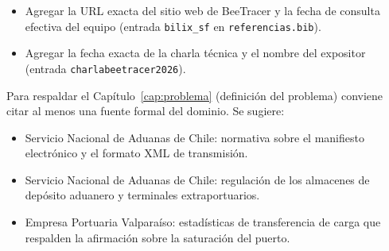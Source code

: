 
\begin{pendiente}
\begin{itemize}
    \item Agregar la URL exacta del sitio web de BeeTracer y la fecha de consulta efectiva del
          equipo (entrada \texttt{bilix\_sf} en \texttt{referencias.bib}).
    \item Agregar la fecha exacta de la charla técnica y el nombre del expositor (entrada
          \texttt{charlabeetracer2026}).
\end{itemize}
\end{pendiente}

\begin{pendiente}
Para respaldar el Capítulo~\ref{cap:problema} (definición del problema) conviene citar al menos una
fuente formal del dominio. Se sugiere:

\begin{itemize}
    \item Servicio Nacional de Aduanas de Chile: normativa sobre el manifiesto electrónico y el
          formato XML de transmisión.
    \item Servicio Nacional de Aduanas de Chile: regulación de los almacenes de depósito aduanero y
          terminales extraportuarios.
    \item Empresa Portuaria Valparaíso: estadísticas de transferencia de carga que respalden la
          afirmación sobre la saturación del puerto.
\end{itemize}
\end{pendiente}
